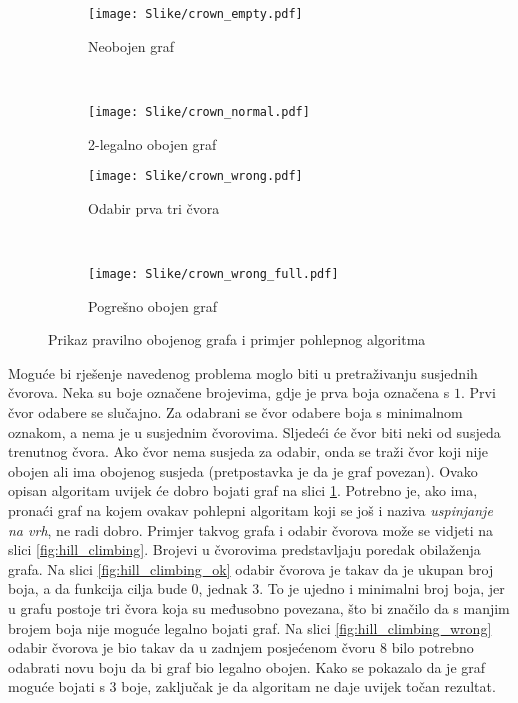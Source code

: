 \documentclass[times, utf8, diplomski, numeric]{fer}
\begin{document}
\begin{figure}
        \centering
        \begin{subfigure}[b]{0.33\textwidth}
                \texttt{[image: Slike/crown\_empty.pdf]}
                \caption{Neobojen graf}
                \label{fig:crown_empty}
        \end{subfigure}
        ~
        \begin{subfigure}[b]{0.33\textwidth}
                \texttt{[image: Slike/crown\_normal.pdf]}
                \caption{2-legalno obojen graf}
                \label{fig:crown_normal}
        \end{subfigure}
         
        \begin{subfigure}[b]{0.33\textwidth}
                \texttt{[image: Slike/crown\_wrong.pdf]}
                \caption{Odabir prva tri čvora}
                \label{fig:crown_wrong}
        \end{subfigure}
        ~
        \begin{subfigure}[b]{0.33\textwidth}
                \texttt{[image: Slike/crown\_wrong\_full.pdf]}
                \caption{Pogrešno obojen graf}
                \label{fig:crown_wrong_full}
        \end{subfigure}
        \caption{Prikaz pravilno obojenog grafa i primjer pohlepnog algoritma}
        \label{fig:greedy_alg}
\end{figure}


Moguće bi rješenje navedenog problema moglo biti u pretraživanju susjednih čvorova. Neka su boje označene brojevima, gdje je prva boja označena s $1$. Prvi čvor odabere se slučajno. Za odabrani se čvor odabere boja s minimalnom oznakom, a nema je u susjednim čvorovima. Sljedeći će čvor biti neki od susjeda trenutnog čvora. Ako čvor nema susjeda za odabir, onda se traži čvor koji nije obojen ali ima obojenog susjeda (pretpostavka je da je graf povezan). Ovako opisan algoritam uvijek će dobro bojati graf na slici \ref{fig:crown_empty}. Potrebno je, ako ima, pronaći graf na kojem ovakav pohlepni algoritam koji se još i naziva \emph{uspinjanje na vrh}, ne radi dobro. Primjer takvog grafa i odabir čvorova može se vidjeti na slici \ref{fig:hill_climbing}. Brojevi u čvorovima predstavljaju poredak obilaženja grafa. Na slici \ref{fig:hill_climbing_ok} odabir čvorova je takav da je ukupan broj boja, a da funkcija cilja bude $0$, jednak $3$. To je ujedno i minimalni broj boja, jer u grafu postoje tri čvora koja su međusobno povezana, što bi značilo da s manjim brojem boja nije moguće legalno bojati graf. Na slici \ref{fig:hill_climbing_wrong} odabir čvorova je bio takav da u zadnjem posjećenom čvoru $8$ bilo potrebno odabrati novu boju da bi graf bio legalno obojen. Kako se pokazalo da je graf moguće bojati s $3$ boje, zaključak je da algoritam ne daje uvijek točan rezultat.
\end{document}
